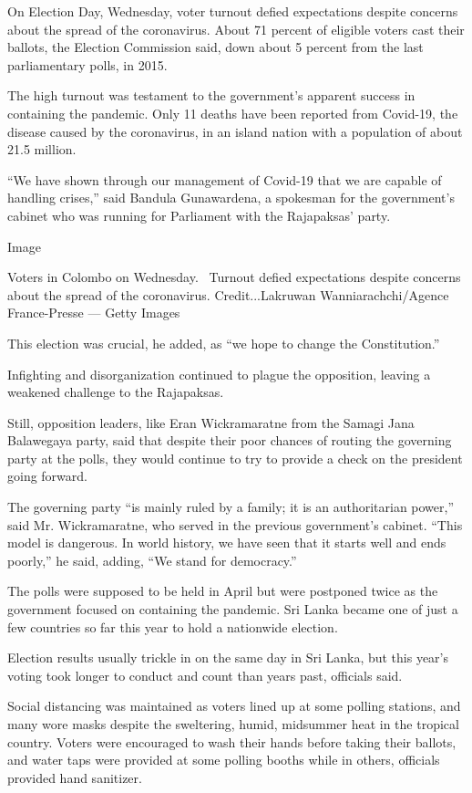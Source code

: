 On Election Day, Wednesday, voter turnout defied expectations despite
concerns about the spread of the coronavirus. About 71 percent of
eligible voters cast their ballots, the Election Commission said, down
about 5 percent from the last parliamentary polls, in 2015.

The high turnout was testament to the government's apparent success in
containing the pandemic. Only 11 deaths have been reported from
Covid-19, the disease caused by the coronavirus, in an island nation
with a population of about 21.5 million.

``We have shown through our management of Covid-19 that we are capable
of handling crises,'' said Bandula Gunawardena, a spokesman for the
government's cabinet who was running for Parliament with the Rajapaksas'
party.

Image

Voters in Colombo on Wednesday.~ Turnout defied expectations despite
concerns about the spread of the coronavirus. Credit...Lakruwan
Wanniarachchi/Agence France-Presse --- Getty Images

This election was crucial, he added, as ``we hope to change the
Constitution.''

Infighting and disorganization continued to plague the opposition,
leaving a weakened challenge to the Rajapaksas.

Still, opposition leaders, like Eran Wickramaratne from the Samagi Jana
Balawegaya party, said that despite their poor chances of routing the
governing party at the polls, they would continue to try to provide a
check on the president going forward.

The governing party ``is mainly ruled by a family; it is an
authoritarian power,'' said Mr. Wickramaratne, who served in the
previous government's cabinet. ``This model is dangerous. In world
history, we have seen that it starts well and ends poorly,'' he said,
adding, ``We stand for democracy.''

The polls were supposed to be held in April but were postponed twice as
the government focused on containing the pandemic. Sri Lanka became one
of just a few countries so far this year to hold a nationwide election.

Election results usually trickle in on the same day in Sri Lanka, but
this year's voting took longer to conduct and count than years past,
officials said.

Social distancing was maintained as voters lined up at some polling
stations, and many wore masks despite the sweltering, humid, midsummer
heat in the tropical country. Voters were encouraged to wash their hands
before taking their ballots, and water taps were provided at some
polling booths while in others, officials provided hand sanitizer.

